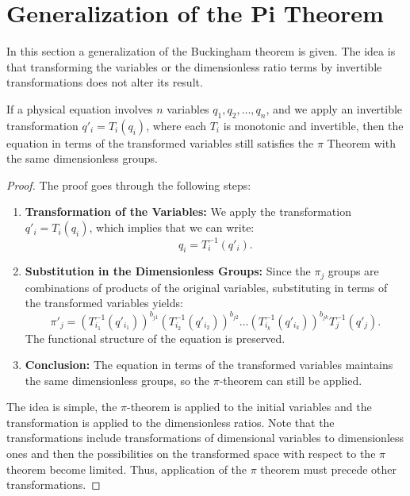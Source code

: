 \section{Generalization of the Pi Theorem}

In this section a generalization of the Buckingham theorem is given. The idea is that transforming the variables or the dimensionless ratio terms by invertible transformations does not alter its result.

\begin{theorem}
\label{thm:generalization}
If a physical equation involves $n$ variables $q_1,q_2,\ldots,q_n$, and we apply an invertible transformation $q'_i = T_i(q_i)$, where each $T_i$ is monotonic and invertible, then the equation in terms of the transformed variables still satisfies the $\pi$ Theorem with the same dimensionless groups.
\end{theorem}

\begin{proof}
The proof goes through the following steps:
\begin{enumerate}
\item \textbf{Transformation of the Variables:} We apply the transformation $q'_i = T_i(q_i)$, which implies that we can write:
\begin{equation}
q_i = T_i^{-1}(q'_i).
\label{eq:inversetransform}
\end{equation}

\item \textbf{Substitution in the Dimensionless Groups:} Since the $\pi_j$ groups are combinations of products of the original variables, substituting in terms of the transformed variables yields:
\begin{equation}
\pi'_j = (T_{i_1}^{-1}(q'_{i_1}))^{b_{j1}} (T_{i_2}^{-1}(q'_{i_2}))^{b_{j2}}\ldots(T_{i_k}^{-1}(q'_{i_k}))^{b_{jk}}T_j^{-1}(q'_j).
\label{eq:transformedpi}
\end{equation}
The functional structure of the equation is preserved.

\item \textbf{Conclusion:} The equation in terms of the transformed variables maintains the same dimensionless groups, so the $\pi$-theorem can still be applied.
\end{enumerate}

The idea is simple, the $\pi$-theorem is applied to the initial variables and the transformation is applied to the dimensionless ratios. Note that the transformations include transformations of dimensional variables to dimensionless ones and then the possibilities on the transformed space with respect to the $\pi$ theorem become limited. Thus, application of the $\pi$ theorem must precede other transformations.
\end{proof}

